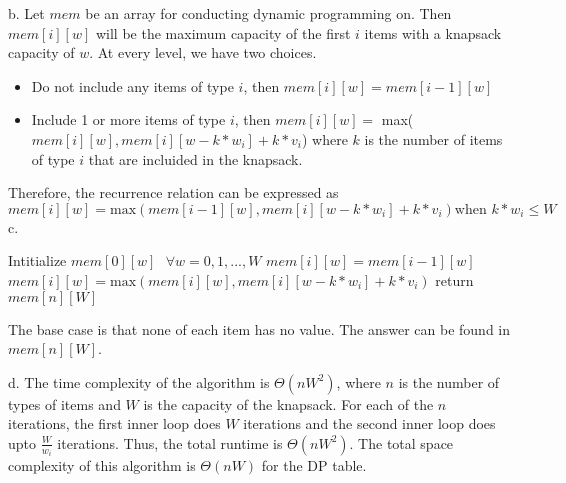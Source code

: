 \documentclass[12pt]{article}
\begin{document}
b. Let $mem$ be an array for conducting dynamic programming on. Then $mem[i][w]$ will be the maximum capacity of the first $i$ items with a knapsack capacity of $w$. At every level, we have two choices.
\begin{itemize}
    \item Do not include any items of type $i$, then $mem[i][w]=mem[i-1][w]$
    \item Include 1 or more items of type $i$, then $mem[i][w]=$ max($mem[i][w],mem[i][w-k*w_i]+k*v_i$) where $k$ is the number of items of type $i$ that are incluided in the knapsack.
\end{itemize}
Therefore, the recurrence relation can be expressed as 
$$
mem[i][w]= \text{max}(mem[i-1][w], mem[i][w-k*w_i]+k*v_i)\text{when }k*w_i\leq W 
$$
\newpage
c. \begin{algorithmic}
        \State Intitialize $mem[0][w] \text{ } \forall w = 0,1,...,W$
                \State $mem[i][w]=mem[i-1][w]$
                    \State $mem[i][w]=\text{max}(mem[i][w], mem[i][w-k*w_i]+k*v_i)$
                \EndFor
            \EndFor
        \EndFor
        \State return $mem[n][W]$
    \EndProcedure
\end{algorithmic}
The base case is that none of each item has no value. The answer can be found in $mem[n][W]$.

d. The time complexity of the algorithm is $\Theta(nW^2)$, where $n$ is the number of types of items and $W$ is the capacity of the knapsack. For each of the $n$ iterations, the first inner loop does $W$ iterations and the second inner loop does upto $\frac{W}{w_i}$ iterations. Thus, the total runtime is $\Theta(nW^2)$. The total space complexity of this algorithm is $\Theta(nW)$ for the DP table.
\end{document}
